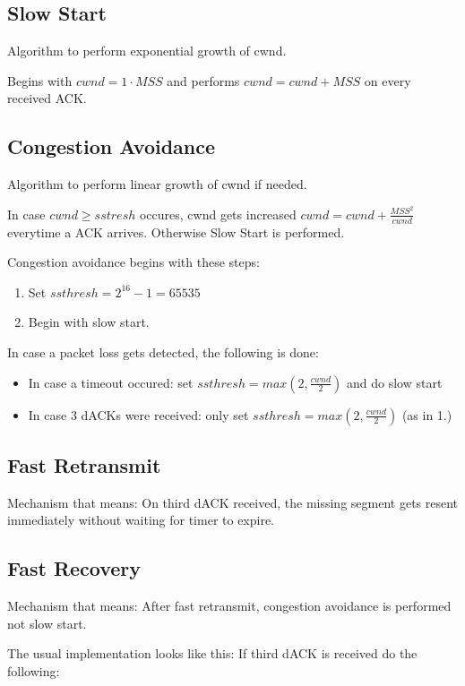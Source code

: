 \documentclass{article}
\begin{document}
\subsection{Slow Start}
Algorithm to perform exponential growth of cwnd.

Begins with $cwnd = 1 \cdot MSS$ and performs $cwnd = cwnd + MSS$ on every received ACK.

\subsection{Congestion Avoidance}
Algorithm to perform linear growth of cwnd if needed.

In case $cwnd \geq sstresh$ occures, cwnd gets increased $cwnd = cwnd + \frac{MSS^{2}}{cwnd}$ everytime a ACK arrives. Otherwise Slow Start is performed.

Congestion avoidance begins with these steps:

\begin{enumerate}
     \item Set $ssthresh = 2^{16} -1 = 65535$
     \item Begin with slow start.
\end{enumerate}

In case a packet loss gets detected, the following is done:

\begin{itemize}
     \item In case a timeout occured: set $ssthresh = max(2, \frac{cwnd}{2})$ and do slow start
     \item In case 3 dACKs were received: only set $ssthresh = max(2, \frac{cwnd}{2})$ (as in 1.)
\end{itemize}

\subsection{Fast Retransmit}
Mechanism that means: On third dACK received, the missing segment gets resent immediately without waiting for timer to expire.

\subsection{Fast Recovery}
Mechanism that means: After fast retransmit, congestion avoidance is performed not slow start.

The usual implementation looks like this: If third dACK is received do the following:
\end{document}
